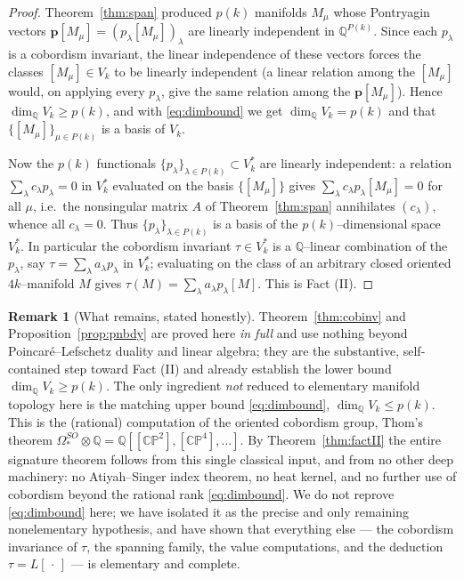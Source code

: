 \documentclass[12pt]{article}
\theoremstyle{definition}
\newtheorem{remark}{Remark}
\begin{document}
\begin{proof}
Theorem~\ref{thm:span} produced $p(k)$ manifolds $M_\mu$ whose Pontryagin vectors
$\mathbf p[M_\mu]=(p_\lambda[M_\mu])_\lambda$ are linearly independent in
$\mathbb Q^{P(k)}$.  Since each $p_\lambda$ is a cobordism invariant, the linear
independence of these vectors forces the classes $[M_\mu]\in V_k$ to be linearly
independent (a linear relation among the $[M_\mu]$ would, on applying every $p_\lambda$,
give the same relation among the $\mathbf p[M_\mu]$).  Hence
$\dim_{\mathbb Q}V_k\ge p(k)$, and with \eqref{eq:dimbound} we get
$\dim_{\mathbb Q}V_k=p(k)$ and that $\{[M_\mu]\}_{\mu\in P(k)}$ is a basis of $V_k$.

Now the $p(k)$ functionals $\{p_\lambda\}_{\lambda\in P(k)}\subset V_k^\ast$ are linearly
independent: a relation $\sum_\lambda c_\lambda p_\lambda=0$ in $V_k^\ast$ evaluated on
the basis $\{[M_\mu]\}$ gives $\sum_\lambda c_\lambda p_\lambda[M_\mu]=0$ for all $\mu$,
i.e.\ the nonsingular matrix $A$ of Theorem~\ref{thm:span} annihilates $(c_\lambda)$,
whence all $c_\lambda=0$.  Thus $\{p_\lambda\}_{\lambda\in P(k)}$ is a basis of the
$p(k)$--dimensional space $V_k^\ast$.  In particular the cobordism invariant
$\tau\in V_k^\ast$ is a $\mathbb Q$--linear combination of the $p_\lambda$, say
$\tau=\sum_\lambda a_\lambda p_\lambda$ in $V_k^\ast$; evaluating on the class of an
arbitrary closed oriented $4k$--manifold $M$ gives
$\tau(M)=\sum_\lambda a_\lambda p_\lambda[M]$.  This is Fact (II).
\end{proof}

\begin{remark}[What remains, stated honestly]\label{rem:honest}
Theorem~\ref{thm:cobinv} and Proposition~\ref{prop:pnbdy} are proved here \emph{in full}
and use nothing beyond Poincar\'e--Lefschetz duality and linear algebra; they are the
substantive, self-contained step toward Fact (II) and already establish the lower bound
$\dim_{\mathbb Q}V_k\ge p(k)$.  The only ingredient \emph{not} reduced to elementary
manifold topology here is the matching upper bound \eqref{eq:dimbound},
$\dim_{\mathbb Q}V_k\le p(k)$.  This is the (rational) computation of the oriented
cobordism group, Thom's theorem
$\Omega^{SO}_\ast\otimes\mathbb Q=\mathbb Q[[\mathbb{CP}^2],[\mathbb{CP}^4],\dots]$.
By Theorem~\ref{thm:factII} the entire signature theorem follows from this single
classical input, and from no other deep machinery: no Atiyah--Singer index theorem, no
heat kernel, and no further use of cobordism beyond the rational rank
\eqref{eq:dimbound}.  We do not reprove \eqref{eq:dimbound} here; we have isolated it as
the precise and only remaining nonelementary hypothesis, and have shown that everything
else --- the cobordism invariance of $\tau$, the spanning family, the value
computations, and the deduction $\tau=L[\,\cdot\,]$ --- is elementary and complete.
\end{remark}
\end{document}
